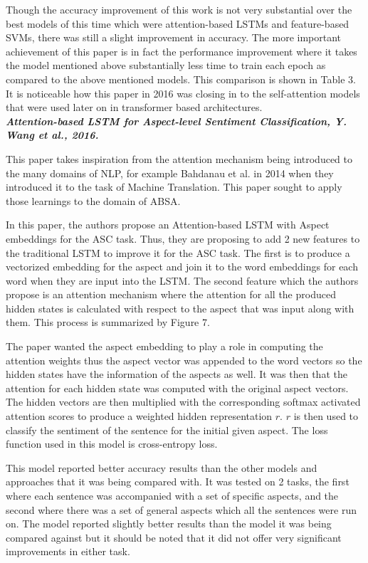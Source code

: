 \documentclass[conference]{IEEEtran}
\begin{document}
Though the accuracy improvement of this work is not very substantial over the best models of this time which were attention-based LSTMs and feature-based SVMs, there was still a slight improvement in accuracy. The more important achievement of this paper is in fact the performance improvement where it takes the model mentioned above substantially less time to train each epoch as compared to the above mentioned models. This comparison is shown in Table 3. It is noticeable how this paper in 2016 was closing in to the self-attention models that were used later on in transformer based architectures.\\

\textit{\textbf{Attention-based LSTM for Aspect-level Sentiment Classification, Y. Wang et al., 2016.}}

This paper takes inspiration from the attention mechanism being introduced to the many domains of NLP, for example Bahdanau et al. in 2014 when they introduced it to the task of Machine Translation. This paper sought to apply those learnings to the domain of ABSA.

In this paper, the authors propose an Attention-based LSTM with Aspect embeddings for the ASC task. Thus, they are proposing to add 2 new features to the traditional LSTM to improve it for the ASC task. The first is to produce a vectorized embedding for the aspect and join it to the word embeddings for each word when they are input into the LSTM. The second feature which the authors propose is an attention mechanism where the attention for all the produced hidden states is calculated with respect to the aspect that was input along with them. This process is summarized by Figure 7.

The paper wanted the aspect embedding to play a role in computing the attention weights thus the aspect vector was appended to the word vectors so the hidden states have the information of the aspects as well. It was then that the attention for each hidden state was computed with the original aspect vectors. The hidden vectors are then multiplied with the corresponding softmax activated attention scores to produce a weighted hidden representation $r$. $r$ is then used to classify the sentiment of the sentence for the initial given aspect. The loss function used in this model is cross-entropy loss.

This model reported better accuracy results than the other models and approaches that it was being compared with. It was tested on 2 tasks, the first where each sentence was accompanied with a set of specific aspects, and the second where there was a set of general aspects which all the sentences were run on. The model reported slightly better results than the model it was being compared against but it should be noted that it did not offer very significant improvements in either task.
\end{document}
